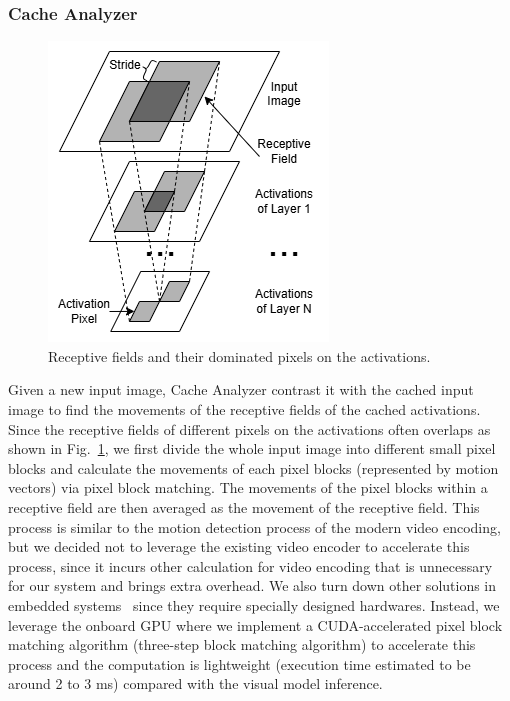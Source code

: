 \subsubsection{Cache Analyzer}
\begin{figure}
    \includegraphics[width=0.5\linewidth]{fig/insight.drawio.png}
    \caption[short]{Receptive fields and their dominated pixels on the activations.}
    \label{fig:receptive field}
\end{figure}
Given a new input image, Cache Analyzer contrast it with the cached input image to find the movements of the receptive fields of the cached activations.
Since the receptive fields of different pixels on the activations often overlaps as shown in Fig.~\ref{fig:receptive field}, we first divide the whole input image into different small pixel blocks and calculate the movements of each pixel blocks (represented by motion vectors) via pixel block matching.
The movements of the pixel blocks within a receptive field are then averaged as the movement of the receptive field.
This process is similar to the motion detection process of the modern video encoding, but we decided not to leverage the existing video encoder to accelerate this process, since it incurs other calculation for video encoding that is unnecessary for our system and brings extra overhead.
We also turn down other solutions in embedded systems~\cite{buckler_eva_2018} since they require specially designed hardwares.
Instead, we leverage the onboard GPU where we implement a CUDA-accelerated pixel block matching algorithm (three-step block matching algorithm) to accelerate this process and the computation is lightweight (execution time estimated to be around 2 to 3 ms) compared with the visual model inference.

